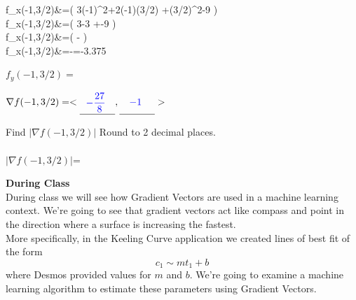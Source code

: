 \documentclass[11pt]{article}
\begin{document}
{{{{{ 
  f_x(-1,3/2)&=\left( 3(-1)^2+2\cdot(-1)\cdot (3/2) +(3/2)^2-9 \right)\\
  f_x(-1,3/2)&=\left( 3-3 +-9 \right)\\
f_x(-1,3/2)&=\left( - \right)\\
f_x(-1,3/2)&=-=-3.375
 }
 }
  \item $f_y(-1,3/2)=$
 }
 $\ds \nabla f(-1,3/2)=<\unline{.5}{\blue{$-\dfrac{27}{8}$}}{.3},\unline{.5}{\blue{$-1$}}{.3}>$
 \item Find $\left| \nabla f(-1,3/2) \right|$ Round to 2 decimal places.\\\\
 $\left| \nabla f(-1,3/2) \right|$=
}
}

{\bf During Class}\\
During class we will see how Gradient Vectors are used in a machine learning context.  We're going to see that gradient vectors act like compass and point in the direction where a surface is increasing the fastest. \\

More specifically, in the Keeling Curve application we created lines of best fit of the form $$c_1\sim mt_1+b$$ where Desmos provided values for $m$ and $b$. We're going to examine a machine learning algorithm to estimate these parameters using Gradient Vectors.   
\end{document}
